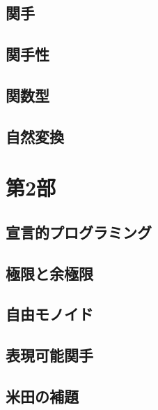 \chapter{関手}\label{functors}


\chapter{関手性}\label{functoriality}


\chapter{関数型}\label{function-types}


\chapter{自然変換}\label{natural-transformations}


\part*{第2部}

\chapter{宣言的プログラミング}\label{declarative-programming}


\chapter{極限と余極限}\label{limits-and-colimits}


\chapter{自由モノイド}\label{free-monoids}


\chapter{表現可能関手}\label{representable-functors}


\chapter{米田の補題}\label{the-yoneda-lemma}


